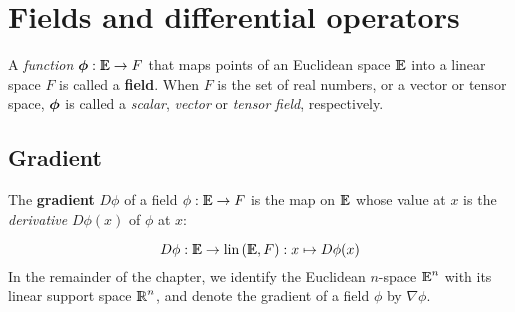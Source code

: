 \documentclass{31x47jw}
\begin{document}
\section{Fields and differential operators}


A \emph{function} ${\mbox{\boldmath $\phi$}}: {\mathbb{I\!\!E}} \rightarrow {F}$ that maps points
of an Euclidean space ${\mathbb{I\!\!E}}$ into a linear space ${F}$ is
called a \textbf{field}.  When ${F}$ is the set of real numbers,
or a vector or tensor space, ${\mbox{\boldmath $\phi$}}$ is called a \emph{scalar},
\emph{vector} or \emph{tensor} \emph{field}, respectively.

\subsection{Gradient}

The \textbf{gradient} $D\phi$ of a field $\phi: {\mathbb{I\!\!E}} \rightarrow
{F}$ is the map on ${\mathbb{I\!\!E}}$ whose value at $x$ is the
\emph{derivative} $D\phi(x)$ of $\phi$ at $x$:

\[
D\phi : {\mathbb{I\!\!E}} \rightarrow \mbox{\rm lin}\, ({\mathbb{I\!\!E}},{F}) : x\mapsto D\phi(x)
\]
In the remainder of the chapter, we identify the Euclidean $n$-space ${\mathbb{I\!\!E}}^{n}$ with
its linear support space $\mathbb{I\!\!R}^{n}$, and denote the gradient of a field
$\phi$ by $\nabla \phi$.
    
% 
\end{document}
